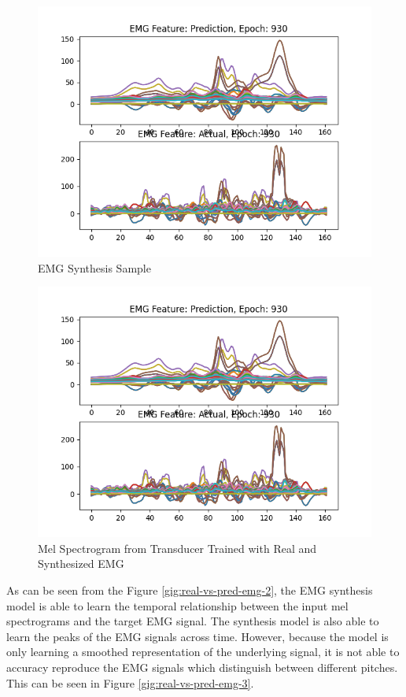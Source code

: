 \begin{figure}[hbtp]
    \caption{EMG Synthesis Sample}
    \label{fig:real-vs-pred-emg-2}
    \centering
    \includegraphics[width=0.75\linewidth]{graphics/emg_augment/real_vs_synth.png}
\end{figure}

\begin{figure}[hbtp]
    \caption{Mel Spectrogram from Transducer Trained with Real and Synthesized EMG}
    \label{fig:real-vs-pred-emg-3}
    \centering
    \includegraphics[width=0.75\linewidth]{graphics/emg_augment/real_vs_synth.png}
\end{figure}

As can be seen from the Figure \ref{gig:real-vs-pred-emg-2}, the EMG
synthesis model is able to learn the temporal relationship between
the input mel spectrograms and the target EMG signal. The synthesis
model is also able to learn the peaks of the EMG signals across time.
However, because the model is only learning a smoothed representation
of the underlying signal, it is not able to accuracy reproduce the EMG
signals which distinguish between different pitches. This can be seen
in Figure \ref{gig:real-vs-pred-emg-3}.

